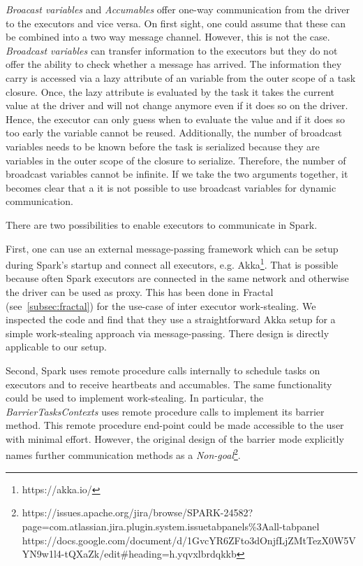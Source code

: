 \textit{Broacast variables} and \textit{Accumables} offer one-way communication from the driver to the executors and vice versa.
On first sight, one could assume that these can be combined into a two way message channel.
However, this is not the case.
\textit{Broadcast variables} can transfer information to the executors but they do not offer the ability to check whether a message has
arrived.
The information they carry is accessed via a lazy attribute of an variable from the outer scope of a task closure.
Once, the lazy attribute is evaluated by the task it takes the current value at the driver and will not change anymore even if
it does so on the driver.
Hence, the executor can only guess when to evaluate the value and if it does so too early the variable cannot be reused.
Additionally, the number of broadcast variables needs to be known before the task is serialized because they are variables in the outer
scope of the closure to serialize.
Therefore, the number of broadcast variables cannot be infinite.
If we take the two arguments together, it becomes clear that a it is not possible to use broadcast variables for dynamic communication.

There are two possibilities to enable executors to communicate in Spark.

First, one can use an external message-passing framework which can be setup during Spark's startup and connect all executors, e.g.
Akka\footnote{https://akka.io/}.
That is possible because often Spark executors are connected in the same network and otherwise the driver can be used as proxy.
This has been done in Fractal (see~\cref{subsec:fractal}) for the use-case of inter executor work-stealing.
We inspected the code and find that they use a straightforward Akka setup for a simple work-stealing approach via message-passing.
There design is directly applicable to our setup.

Second, Spark uses remote procedure calls internally to schedule tasks on executors and to receive heartbeats and accumables.
The same functionality could be used to implement work-stealing.
In particular, the \textit{BarrierTasksContexts} uses remote procedure calls to implement its barrier method.
This remote procedure end-point could be made accessible to the user with minimal effort.
However, the original design of the barrier mode explicitly names further communication methods as a \textit{Non-goal}\footnote{
https://issues.apache.org/jira/browse/SPARK-24582?page=com.atlassian.jira.plugin.system.issuetabpanels\%3Aall-tabpanel\\
https://docs.google.com/document/d/1GvcYR6ZFto3dOnjfLjZMtTezX0W5VYN9w1l4-tQXaZk/edit\#heading=h.yqvxlbrdqkkb}.

